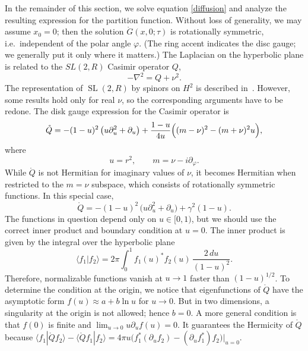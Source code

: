 \documentclass[12pt]{article}
\newcommand*{\braket}[2]{\langle{#1}|{#2}\rangle}
\newcommand{\vp}{\varphi}
\newcommand{\RR}{\mathbb{R}}
\DeclareMathOperator{\SL}{SL}
\DeclareMathOperator{\tSL}{\widetilde{\mathrm{SL}}}
\DeclareMathOperator{\HH}{H}
\newcommand{\rG}{\mathring{G}}
\newcommand{\rQ}{\mathring{Q}}
\def\ie{i.e.\ }
\def\widetilde#1{#1}%
\def\HH{H}
\def\SL{SL}
\def\RR{R}
\begin{document}
In the remainder of this section, we solve equation \eqref{diffusion} and analyze the resulting expression for the partition function. Without loss of generality, we may assume $x_0=0$; then the solution $\rG(x,0;\tau)$ is rotationally symmetric, \ie independent of the polar angle $\vp$. (The ring accent indicates the disc gauge; we generally put it only where it matters.) The Laplacian on the hyperbolic plane is related to the $\SL(2,\RR)$ Casimir operator $Q$,
\begin{equation} \label{nabla}
-\nabla^2=Q+\nu^2.
\end{equation}
The representation of $\tSL(2,\RR)$ by spinors on $\HH^2$ is described in~\cite{SL2R}. However, some results hold only for real $\nu$, so the corresponding arguments have to be redone. The disk gauge expression for the Casimir operator is
\begin{equation} \label{Q_d_gauge}
\rQ=-(1-u)^2\,\bigl(u\partial_{u}^2+\partial_{u}\bigr)
+\frac{1-u}{4u}\Bigl((m-\nu)^2-(m+\nu)^{2}u\Bigr),
\end{equation}
where
\begin{equation}
u=r^2,\qquad m=\nu-i\partial_{\vp}.
\end{equation}
While $\rQ$ is not Hermitian for imaginary values of $\nu$, it becomes Hermitian when restricted to the $m=\nu$ subspace, which consists of rotationally symmetric functions. In this special case,
\begin{equation}\label{Q0}
\rQ=-(1-u)^2\,\bigl(u\partial_{u}^2+\partial_{u}\bigr)+\gamma^2(1-u).
\end{equation}
The functions in question depend only on $u\in[0,1)$, but we should use the correct inner product and boundary condition at $u=0$. The inner product is given by the integral over the hyperbolic plane
\begin{equation}
\braket{f_1}{f_2}=2\pi\int_{0}^{1}f_1(u)^{*}f_2(u)\,\frac{2\,du}{(1-u)^2}.
\end{equation}
Therefore, normalizable functions vanish at $u\to 1$ faster than $(1-u)^{1/2}$. To determine the condition at the origin, we notice that eigenfunctions of $\rQ$ have the asymptotic form $f(u)\approx a+b\ln u$ for $u\to 0$. But in two dimensions, a singularity at the origin is not allowed; hence $b=0$. A more general condition is that $f(0)$ is finite and $\lim_{u\to 0} u\partial_{u}f(u)=0$. It guarantees the Hermicity of $\rQ$ because $\braket{f_1}{\rQ f_2}-\braket{\rQ f_1}{f_2}=4\pi u\bigl(f_1^*(\partial_{u}f_2)-(\partial_{u}f_1^*)f_2\bigr)\big|_{u=0}$.
\end{document}
